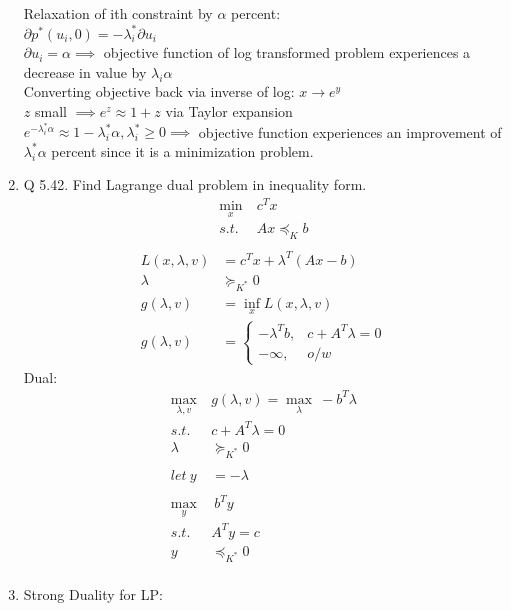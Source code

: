 \documentclass[12pt,letter]{article}
\begin{document}
\begin{enumerate}
  Relaxation of ith constraint by $\alpha$ percent:\\
  $\partial p^*(u_i,0) = -\lambda_i^*\partial u_i$\\
  $\partial u_i = \alpha \implies$ objective function of log transformed problem experiences a decrease in value by $\lambda_i \alpha$\\
  Converting objective back via inverse of log: $x \to e^{y}$\\
  $z$ small $\implies e^{z} \approx 1+ z$ via Taylor expansion\\
  $e^{-\lambda_i^* \alpha} \approx 1 - \lambda_i^* \alpha, \lambda_i^* \geq 0 \implies$ objective function experiences an improvement of $\lambda_i^* \alpha$ percent since it is a minimization problem.\\
  \pagebreak
\item Q 5.42. Find Lagrange dual problem in inequality form.
  \begin{align*}
    \min_x\ & c^Tx\\
    s.t.\ & Ax \preceq_K b\\
  \end{align*}
  \begin{align*}
    L(x,\lambda,v) & = c^Tx + \lambda^T(Ax-b)\\
    \lambda & \succeq_{K^*} 0\\
    g (\lambda,v) &= \inf_x L(x,\lambda,v)\\
    g (\lambda,v) &=
                    \begin{cases}
                      -\lambda^Tb, & c + A^T\lambda = 0\\
                      -\infty, & o/w
                    \end{cases}
  \end{align*}
  Dual:
  \begin{align*}
    \max_{\lambda,v}\ & g(\lambda,v) = \max_{\lambda}\ -b^T\lambda\\
    s.t.\ & c+A^T\lambda = 0\\
    \lambda & \succeq_{K^*} 0\\
    \\
    let\ y & = -\lambda\\
    \\
    \max_{y}&\ b^Ty\\
    s.t.\ & A^Ty = c\\
    y & \preceq_{K^*} 0\\
  \end{align*}
  \pagebreak
\item Strong Duality for LP:\\

\end{enumerate}
\end{document}
